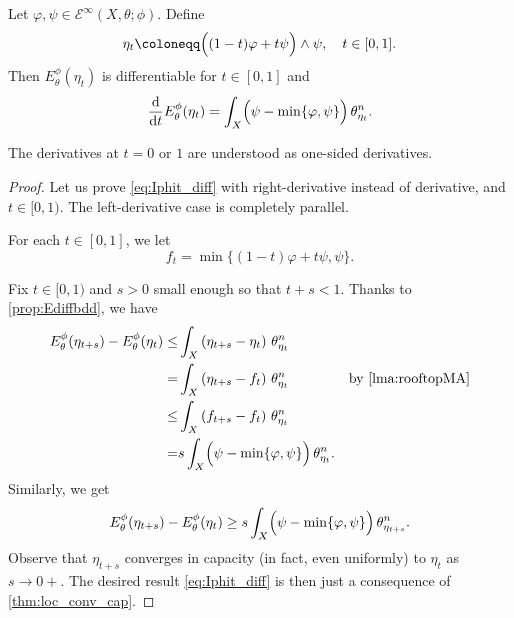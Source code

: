 \begin{lemma}\label{lma:Ediff}
    Let $\varphi,\psi\in \mathcal{E}^{\infty}(X,\theta;\phi)$. Define
    \[
    \eta_t\coloneqq \Bigl( (1-t)\varphi+t\psi \Bigr)\land \psi,\quad t\in [0,1].
    \]
    Then $E_{\theta}^{\phi}(\eta_t)$ is differentiable for $t\in [0,1]$ and
    \begin{equation}\label{eq:Iphit_diff}
    \frac{\mathrm{d}}{\mathrm{d}t}E_{\theta}^{\phi}(\eta_t)=\int_{X} \Bigl( \psi-\min\{\varphi,\psi\} \Bigr)\,\theta_{\eta_t}^n.
    \end{equation}
\end{lemma}
    The derivatives at $t=0$ or $1$ are understood as one-sided derivatives.
\begin{proof}
    Let us prove \eqref{eq:Iphit_diff} with right-derivative instead of derivative, and $t\in [0,1)$. The left-derivative case is completely parallel.

    For each $t\in [0,1]$, we let
    \[
    f_t=\min \{ (1-t)\varphi+t\psi, \psi\}.
    \]

    Fix $t\in [0,1)$ and $s>0$ small enough so that $t+s<1$. Thanks to \cref{prop:Ediffbdd}, we have
    \[
    \begin{aligned}
    E_{\theta}^{\phi}(\eta_{t+s})-E_{\theta}^{\phi}(\eta_{t})\leq & \int_X \left(\eta_{t+s}-\eta_t\right)\,\theta_{\eta_t}^n \\
    =& \int_X \left(\eta_{t+s}-f_t\right)\,\theta_{\eta_t}^n &\textup{by \cref{lma:rooftopMA}}\\
    \leq & \int_X \left(f_{t+s}-f_t \right)\,\theta_{\eta_t}^n\\
    =& s\int_X  \Bigl(\psi-\min\{\varphi,\psi\}\Bigr)\,\theta_{\eta_t}^n.
    \end{aligned}
    \]
    Similarly, we get
    \[
    E_{\theta}^{\phi}(\eta_{t+s})-E_{\theta}^{\phi}(\eta_{t})\geq s\int_X  \Bigl(\psi-\min\{\varphi,\psi\}\Bigr)\,\theta_{\eta_{t+s}}^n.
    \]
    Observe that $\eta_{t+s}$ converges in capacity (in fact, even uniformly) to $\eta_t$ as $s\to 0+$. The desired result \eqref{eq:Iphit_diff} is then just a consequence of \cref{thm:loc_conv_cap}.
\end{proof}



